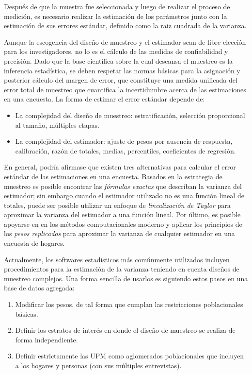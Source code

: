 \documentclass[
  12pt,
]{book}
\providecommand{\tightlist}{%
  \setlength{\itemsep}{0pt}\setlength{\parskip}{0pt}}
\begin{document}
Después de que la muestra fue seleccionada y luego de realizar el proceso de medición, es necesario realizar la estimación de los parámetros junto con la estimación de sus errores estándar, definido como la raiz cuadrada de la varianza.

Aunque la escogencia del diseño de muestreo y el estimador sean de libre elección para los investigadores, no lo es el cálculo de las medidas de confiabilidad y precisión. Dado que la base científica sobre la cual descansa el muestreo es la inferencia estadística, se deben respetar las normas básicas para la asignación y posterior cálculo del margen de error, que constituye una medida unificada del error total de muestreo que cuantifica la incertidumbre acerca de las estimaciones en una encuesta. La forma de estimar el error estándar depende de:

\begin{itemize}
\tightlist
\item
  La complejidad del diseño de muestreo: estratificación, selección proporcional al tamaño, múltiples etapas.
\item
  La complejidad del estimador: ajuste de pesos por ausencia de respuesta, calibración, razón de totales, medias, percentiles, coeficientes de regresión.
\end{itemize}

En general, podría afirmase que existen tres alternativas para calcular el error estándar de las estimaciones en una encuesta. Basados en la estrategia de muestreo es posible encontrar las \emph{fórmulas exactas} que describan la varianza del estimador; sin embargo cuando el estimador utilizado no es una función lineal de totales, puede ser posible utilizar un enfoque de \emph{linealización de Taylor} para aproximar la varianza del estimador a una función lineal. Por último, es posible apoyarse en en los métodos computacionales moderno y aplicar los principios de los \emph{pesos replicados} para aproximar la varianza de cualquier estimador en una encuesta de hogares.

Actualmente, los softwares estadísticos más comúnmente utilizados incluyen
procedimientos para la estimación de la varianza teniendo en cuenta
diseños de muestreo complejos. Una forma sencilla de usarlos es
siguiendo estos pasos en una base de datos agregada:

\begin{enumerate}
\def\labelenumi{\arabic{enumi}.}
\tightlist
\item
  Modificar los pesos, de tal forma que cumplan las restricciones
  poblacionales básicas.
\item
  Definir los estratos de interés en donde el diseño de muestreo se
  realiza de forma independiente.
\item
  Definir estrictamente las UPM como aglomerados poblacionales que
  incluyen a los hogares y personas (con sus múltiples entrevistas).
\end{enumerate}
\end{document}
